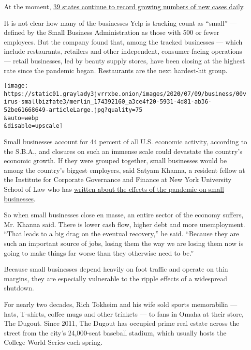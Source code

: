 At the moment,
\href{https://www.nytimes3xbfgragh.onion/2020/07/13/world/coronavirus-updates.html?action=click\&module=Top\%20Stories\&pgtype=Homepage\#link-609d3a0e}{39
states continue to record growing numbers of new cases daily}.

It is not clear how many of the businesses Yelp is tracking count as
``small'' --- defined by the Small Business Administration as those with
500 or fewer employees. But the company found that, among the tracked
businesses --- which include restaurants, retailers and other
independent, consumer-facing operations --- retail businesses, led by
beauty supply stores, have been closing at the highest rate since the
pandemic began. Restaurants are the next hardest-hit group.

\texttt{[image: https://static01.graylady3jvrrxbe.onion/images/2020/07/09/business/00virus-smallbizfate3/merlin\_174392160\_a3ce4f20-5931-4d81-ab36-52be61668649-articleLarge.jpg?quality=75\\\&auto=webp\\\&disable=upscale]}

Small businesses account for 44 percent of all U.S. economic activity,
according to the S.B.A., and closures on such an immense scale could
devastate the country's economic growth. If they were grouped together,
small businesses would be among the country's biggest employers, said
Satyam Khanna, a resident fellow at the Institute for Corporate
Governance and Finance at New York University School of Law who has
\href{https://www.nytimes3xbfgragh.onion/2020/03/24/opinion/coronavirus-small-businesses.html}{written
about the effects of the pandemic on small businesses}.

So when small businesses close en masse, an entire sector of the economy
suffers, Mr. Khanna said. There is lower cash flow, higher debt and more
unemployment. ``That leads to a big drag on the eventual recovery,'' he
said. ``Because they are such an important source of jobs, losing them
the way we are losing them now is going to make things far worse than
they otherwise need to be.''

Because small businesses depend heavily on foot traffic and operate on
thin margins, they are especially vulnerable to the ripple effects of a
widespread shutdown.

For nearly two decades, Rich Tokheim and his wife sold sports
memorabilia --- hats, T-shirts, coffee mugs and other trinkets --- to
fans in Omaha at their store, The Dugout. Since 2011, The Dugout has
occupied prime real estate across the street from the city's 24,000-seat
baseball stadium, which usually hosts the College World Series each
spring.

